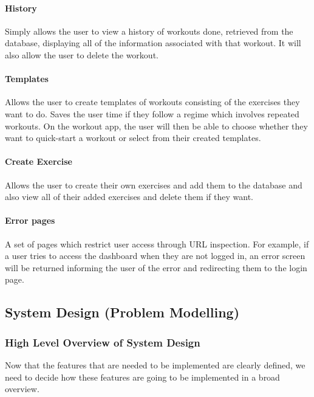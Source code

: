\documentclass{article}
\begin{document}
\paragraph{History}

Simply allows the user to view a history of workouts done, retrieved from the database, displaying all of the information associated with that workout. It will also allow the user to delete the workout.

\paragraph{Templates}

Allows the user to create templates of workouts consisting of the exercises they want to do. Saves the user time if they follow a regime which involves repeated workouts. On the workout app, the user will then be able to choose whether they want to quick-start a workout or select from their created templates. 

\paragraph{Create Exercise}

Allows the user to create their own exercises and add them to the database and also view all of their added exercises and delete them if they want. 

\paragraph{Error pages}

A set of pages which restrict user access through URL inspection. For example, if a user tries to access the dashboard when they are not logged in, an error screen will be returned informing the user of the error and redirecting them to the login page. 

\subsection{System Design (Problem Modelling)}

\subsubsection{High Level Overview of System Design}

Now that the features that are needed to be implemented are clearly defined, we need to decide how these features are going to be implemented in a broad overview. 
\end{document}
